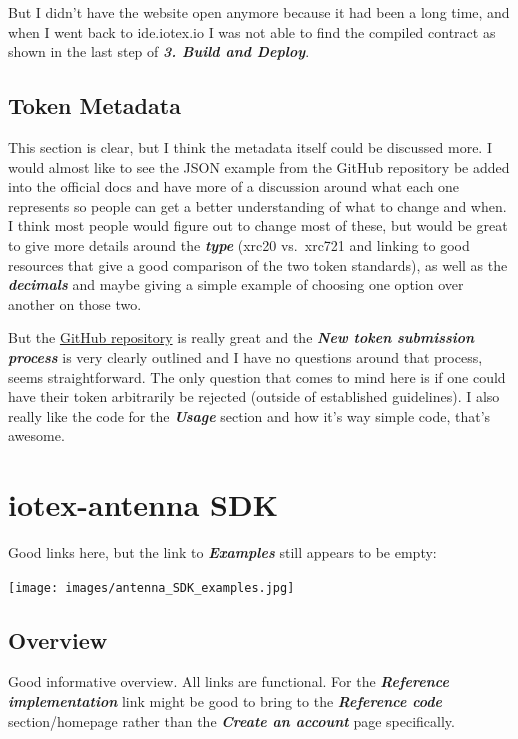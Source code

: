 \documentclass[
]{book}
\begin{document}
But I didn't have the website open anymore because it had been a long
time, and when I went back to ide.iotex.io I was not able to find the
compiled contract as shown in the last step of \textbf{\emph{3. Build
and Deploy}}.

\hypertarget{token-metadata}{%
\section{Token Metadata}\label{token-metadata}}

This section is clear, but I think the metadata itself could be
discussed more. I would almost like to see the JSON example from the
GitHub repository be added into the official docs and have more of a
discussion around what each one represents so people can get a better
understanding of what to change and when. I think most people would
figure out to change most of these, but would be great to give more
details around the \textbf{\emph{type}} (xrc20 vs.~xrc721 and linking to
good resources that give a good comparison of the two token standards),
as well as the \textbf{\emph{decimals}} and maybe giving a simple
example of choosing one option over another on those two.

But the
\href{https://github.com/iotexproject/iotex-token-metadata\#iotex-token-metadata}{GitHub
repository} is really great and the \textbf{\emph{New token submission
process}} is very clearly outlined and I have no questions around that
process, seems straightforward. The only question that comes to mind
here is if one could have their token arbitrarily be rejected (outside
of established guidelines). I also really like the code for the
\textbf{\emph{Usage}} section and how it's way simple code, that's
awesome.

\hypertarget{iotex-antenna-sdk}{%
\chapter{iotex-antenna SDK}\label{iotex-antenna-sdk}}

Good links here, but the link to \textbf{\emph{Examples}} still appears
to be empty:

\texttt{[image: images/antenna\_SDK\_examples.jpg]}

\hypertarget{overview}{%
\section{Overview}\label{overview}}

Good informative overview. All links are functional. For the
\textbf{\emph{Reference implementation}} link might be good to bring to
the \textbf{\emph{Reference code}} section/homepage rather than the
\textbf{\emph{Create an account}} page specifically.
\end{document}
